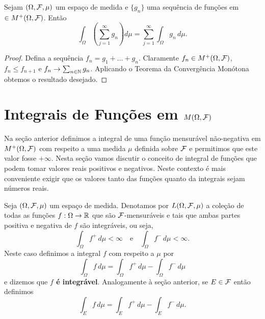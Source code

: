 \begin{corolario}
Sejam $(\Omega,\mathcal{F},\mu)$ um espaço de medida e 
$\{g_n\}$ uma sequência de funções em 
$\in M^{+}(\Omega,\mathcal{F})$. Então 
	\[
		\int_{\Omega} \left(\sum_{j=1}^{\infty} g_n\right) d\mu
		=
		\sum_{j=1}^{\infty}\int_{\Omega}  g_n\, d\mu.
	\]  
\end{corolario}


\begin{proof}
Defina a sequência $f_n=g_1+\ldots+g_n$.
Claramente $f_n\in M^{+}(\Omega,\mathcal{F})$,
$f_n\leq f_{n+1}$ e $f_n\to \sum_{n\in \mathbb{N}} g_n$. 
Aplicando o Teorema da Convergência Monótona obtemos o resultado
desejado.
\end{proof}




\section{Integrais de Funções em $M(\Omega,\mathcal{F})$  }

Na seção anterior definimos a integral de uma 
função mensurável não-negativa em $M^{+}(\Omega,\mathcal{F})$ 
com respeito a uma medida $\mu$ definida sobre $\mathcal{F}$ 
e permitimos que este valor fosse $+\infty$.
Nesta seção vamos discutir o conceito de integral
de funções que podem tomar valores reais
positivos e negativos. Neste contexto 
é mais conveniente 
exigir que os valores tanto das funções quanto 
da integrais sejam números reais.


\begin{definicao}
Seja $(\Omega,\mathcal{F},\mu)$ um espaço de medida. 
Denotamos por $L(\Omega,\mathcal{F},\mu)$ a coleção 
de todas as funções $f:\Omega\to\mathbb{R}$ que 
são $\mathcal{F}$-mensuráveis e tais que ambas
partes positiva e negativa de $f$ são integráveis, 
ou seja,
\[
	\int_{\Omega} f^+\, d\mu<\infty
	\quad\text{e}\quad
	\int_{\Omega} f^-\, d\mu<\infty.
\]
Neste caso definimos a integral $f$ 
com respeito a $\mu$ por
	\[
		\int_{\Omega} f\, d\mu
		=
		\int_{\Omega} f^{+}\, d\mu
		-
		\int_{\Omega} f^{-}\, d\mu
	\]
e dizemos que {\bf $f$ é integrável}.
Analogamente à seção anterior, se $E\in \mathcal{F}$ então definimos 
	\[
		\int_{E} f\, d\mu 
		=
		\int_{E} f^{+}\, d\mu - \int_{E} f^{-}\, d\mu.
	\]
\end{definicao}

